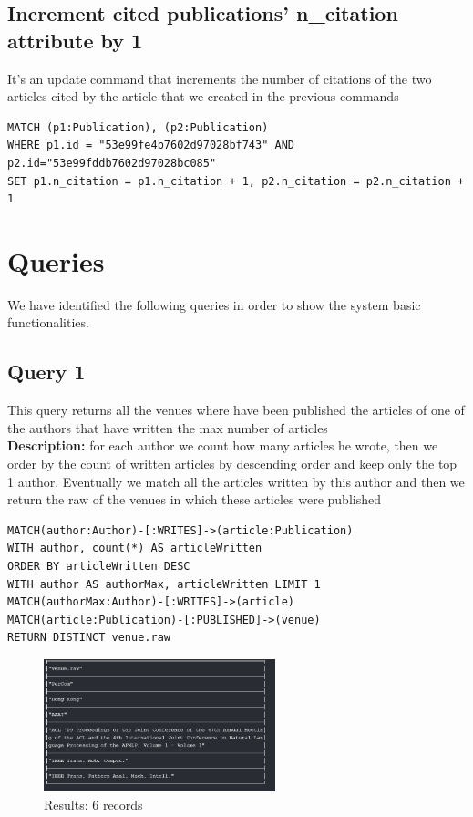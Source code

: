 \documentclass{Configuration_Files/PoliMi3i_thesis}
\begin{document}
\subsection{Increment cited publications' n\_citation attribute by 1}
It's an update command that increments the number of citations of the two articles cited by the article that we created
in the previous commands
\begin{lstlisting}[language=cypher, label=lst:cypher-example]
MATCH (p1:Publication), (p2:Publication)
WHERE p1.id = "53e99fe4b7602d97028bf743" AND p2.id="53e99fddb7602d97028bc085"
SET p1.n_citation = p1.n_citation + 1, p2.n_citation = p2.n_citation + 1
\end{lstlisting}

\section{Queries}
We have identified the following queries in order to show the system basic functionalities.

\subsection{Query 1}
This query returns all the venues where have been published the articles of one of the authors that have written the max number of articles\\
\textbf{Description:} for each author we count how many articles he wrote, then we order by the count of written articles by descending order and keep only the top 1 author. 
Eventually we match all the articles written by this author and then we return the raw of the venues in which these articles were published
\begin{lstlisting}[language=cypher, label=lst:cypher-example]
MATCH(author:Author)-[:WRITES]->(article:Publication)
WITH author, count(*) AS articleWritten
ORDER BY articleWritten DESC
WITH author AS authorMax, articleWritten LIMIT 1
MATCH(authorMax:Author)-[:WRITES]->(article)
MATCH(article:Publication)-[:PUBLISHED]->(venue)
RETURN DISTINCT venue.raw
\end{lstlisting}
\begin{figure}[H]
\centering
\includegraphics[width=0.6\textwidth]{query/query1.PNG}
\caption{Results: 6 records}
\label{fig:query1}
\end{figure}
\end{document}
